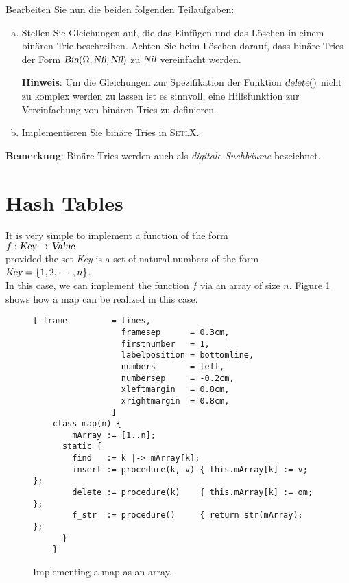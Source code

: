 Bearbeiten Sie nun die beiden folgenden Teilaufgaben:
\begin{enumerate}[(a)]
\item Stellen Sie Gleichungen auf, die das Einf\"ugen und das L\"oschen in einem
      bin\"aren Trie beschreiben.  Achten Sie beim L\"oschen darauf,
      dass bin\"are Tries der Form $\textsl{Bin}(\Omega, \textsl{Nil}, \textsl{Nil})$
      zu $\textsl{Nil}$ vereinfacht werden.

      \textbf{Hinweis}:  Um die Gleichungen zur Spezifikation der Funktion
      $\textsl{delete}()$ nicht zu komplex werden zu lassen ist es sinnvoll, eine
      Hilfsfunktion zur Vereinfachung von bin\"aren Tries zu definieren.
\item Implementieren Sie bin\"are Tries in \textsc{SetlX}.
\end{enumerate}
\textbf{Bemerkung}: Bin\"are Tries werden auch als \emph{digitale Suchb\"aume} bezeichnet.

\section{Hash Tables}
It is very simple to implement a function of the form \\[0.2cm]
\hspace*{1.3cm} $f: \textsl{Key} \rightarrow \textsl{Value}$ \\[0.2cm]
provided the set \textsl{Key} is a set of natural numbers of the form  \\[0.2cm]
\hspace*{1.3cm} $\textsl{Key} = \{ 1, 2, \cdots, n \}$. \\[0.2cm]
In this case, we can implement the function $f$ via an array of size $n$.
Figure \ref{fig:map-array.stlx} shows how a map can be realized in this case.

\begin{figure}[!ht]
\centering
\begin{Verbatim}[ frame         = lines, 
                  framesep      = 0.3cm, 
                  firstnumber   = 1,
                  labelposition = bottomline,
                  numbers       = left,
                  numbersep     = -0.2cm,
                  xleftmargin   = 0.8cm,
                  xrightmargin  = 0.8cm,
                ]
    class map(n) {
        mArray := [1..n];
      static {
        find   := k |-> mArray[k];
        insert := procedure(k, v) { this.mArray[k] := v;  };
        delete := procedure(k)    { this.mArray[k] := om; };
        f_str  := procedure()     { return str(mArray);   };
      }
    }
\end{Verbatim}
\vspace*{-0.3cm}
\caption{Implementing a map as an array.}
\label{fig:map-array.stlx}
\end{figure}




